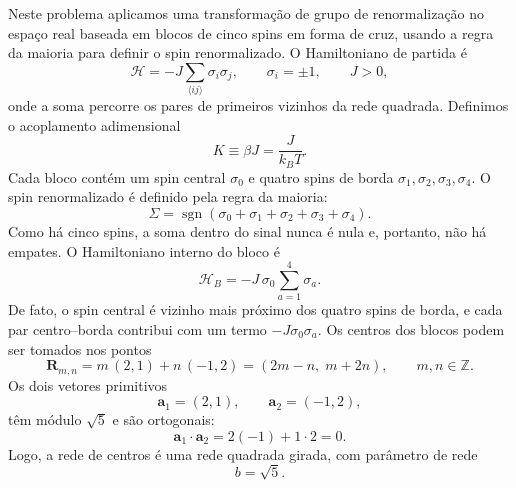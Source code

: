 \documentclass[12pt,a4paper]{article}
\begin{document}
Neste problema aplicamos uma transformação de grupo de renormalização
no espaço real baseada em blocos de cinco spins em forma de cruz,
usando a regra da maioria para definir o spin renormalizado. O
Hamiltoniano de partida é
%
\begin{equation}
    \mathcal H
    =
    -J\sum_{\langle ij\rangle}
    \sigma_i\sigma_j,
    \qquad
    \sigma_i=\pm1,
    \qquad
    J>0,
    \label{eq:H_p3}
\end{equation}
%
onde a soma percorre os pares de primeiros vizinhos da rede quadrada.
Definimos o acoplamento adimensional
%
\begin{equation}
    K\equiv\beta J=\frac{J}{k_BT}.
    \label{eq:K_p3}
\end{equation}
% 
Cada bloco contém um spin central \(\sigma_0\) e quatro spins de borda
\(\sigma_1,\sigma_2,\sigma_3,\sigma_4\). O spin renormalizado é
definido pela regra da maioria:
%
\begin{equation}
    \Sigma
    =
    \operatorname{sgn}
    \left(
        \sigma_0+\sigma_1+\sigma_2+\sigma_3+\sigma_4
    \right).
    \label{eq:majority}
\end{equation}
%
Como há cinco spins, a soma dentro do sinal nunca é nula e, portanto,
não há empates. O Hamiltoniano interno do bloco é
%
\begin{equation}
    \mathcal H_B
    =
    -J\,\sigma_0
    \sum_{a=1}^{4}\sigma_a.
    \label{eq:HB_p3}
\end{equation}
%
De fato, o spin central é vizinho mais próximo dos quatro spins de
borda, e cada par centro--borda contribui com um termo
\(-J\sigma_0\sigma_a\). Os centros dos blocos podem ser tomados nos pontos
%
\begin{equation}
    \mathbf R_{m,n}
    =
    m\,(2,1)+n\,(-1,2)
    =
    (2m-n,\;m+2n),
    \qquad
    m,n\in\mathbb Z.
    \label{eq:centers_p3}
\end{equation}
%
Os dois vetores primitivos
%
\begin{equation}
    \mathbf a_1=(2,1),
    \qquad
    \mathbf a_2=(-1,2),
\end{equation}
%
têm módulo \(\sqrt{5}\) e são ortogonais:
%
\begin{equation}
    \mathbf a_1\cdot\mathbf a_2
    =
    2(-1)+1\cdot 2
    =
    0.
\end{equation}
%
Logo, a rede de centros é uma rede quadrada girada, com parâmetro de
rede
%
\begin{equation}
    b=\sqrt{5}.    \label{eq:b_p3}
\end{equation}
\end{document}
